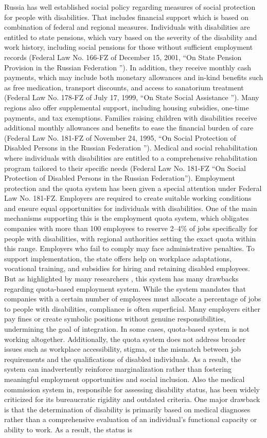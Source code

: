 \documentclass[14pt,a4paper, screen]{scrbook}
\begin{document}
		Russia has well established social policy regarding measures of social protection for people with disabilities. That includes financial support which is based on combination of federal and regional measures. Individuals with disabilities are entitled to state pensions, which vary based on the severity of the disability and work history, including social pensions for those without sufficient employment records (Federal Law No. 166-FZ of December 15, 2001, “On State Pension Provision in the Russian Federation ”). In addition, they receive monthly cash payments, which may include both monetary allowances and in-kind benefits such as free medication, transport discounts, and access to sanatorium treatment (Federal Law No. 178-FZ of July 17, 1999, “On State Social Assistance ”). Many regions also offer supplemental support, including housing subsidies, one-time payments, and tax exemptions. Families raising children with disabilities receive additional monthly allowances and benefits to ease the financial burden of care (Federal Law No. 181-FZ of November 24, 1995, “On Social Protection of Disabled Persons in the Russian Federation ”). Medical and social rehabilitation where individuals with disabilities are entitled to a comprehensive rehabilitation program tailored to their specific needs (Federal Law No. 181-FZ “On Social Protection of Disabled Persons in the Russian Federation”).  Employment protection and the quota system has been given a special attention under Federal Law No. 181-FZ. Employers are required to create suitable working conditions and ensure equal opportunities for individuals with disabilities. One of the main mechanisms supporting this is the employment quota system, which obligates companies with more than 100 employees to reserve 2–4\% of jobs specifically for people with disabilities, with regional authorities setting the exact quota within this range. Employers who fail to comply may face administrative penalties. To support implementation, the state offers help on workplace adaptations, vocational training, and subsidies for hiring and retaining disabled employees. But as highlighted by many researchers , this system has many drawbacks regarding quota-based employment system. While the system mandates that companies with a certain number of employees must allocate a percentage of jobs to people with disabilities, compliance is often superficial. Many employers either pay fines or create symbolic positions without genuine responsibilities, undermining the goal of integration. In some cases, quota-based system is not working altogether. Additionally, the quota system does not address broader issues such as workplace accessibility, stigma, or the mismatch between job requirements and the qualifications of disabled individuals. As a result, the system can inadvertently reinforce marginalization rather than fostering meaningful employment opportunities and social inclusion. Also the medical commission system in, responsible for assessing disability status, has been widely criticized for its bureaucratic rigidity and outdated criteria. One major drawback is that the determination of disability is primarily based on medical diagnoses rather than a comprehensive evaluation of an individual's functional capacity or ability to work. As a result, the status is 
\end{document}
